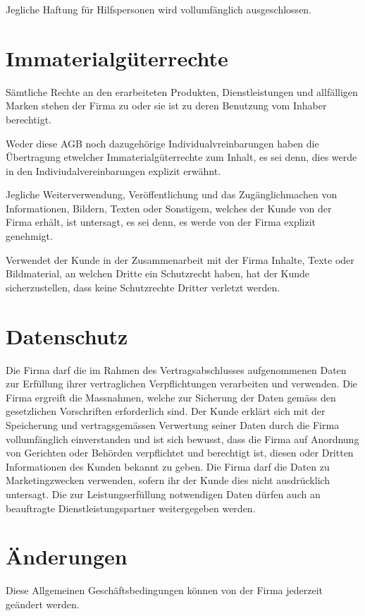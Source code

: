 \documentclass[twocolumn, 10pt]{article}
\begin{document}
Jegliche Haftung für Hilfspersonen wird vollumfänglich ausgeschlossen.

\section{Immaterialgüterrechte}
Sämtliche Rechte an den erarbeiteten Produkten, Dienstleistungen und allfälligen Marken stehen der Firma zu oder sie ist zu deren Benutzung vom Inhaber berechtigt.

Weder diese AGB noch dazugehörige Individualvreinbarungen haben die Übertragung etwelcher Immaterialgüterrechte zum Inhalt, es sei denn, dies werde in den Indiviudalvereinbarungen explizit erwähnt.

Jegliche Weiterverwendung, Veröffentlichung und das Zugänglichmachen von Informationen, Bildern, Texten oder Sonstigem, welches der Kunde von der Firma erhält, ist untersagt, es sei denn, es werde von der Firma explizit genehmigt.

Verwendet der Kunde in der Zusammenarbeit mit der Firma Inhalte, Texte oder Bildmaterial, an welchen Dritte ein Schutzrecht haben, hat der Kunde sicherzustellen, dass keine Schutzrechte Dritter verletzt werden.

\section{Datenschutz}
Die Firma darf die im Rahmen des Vertragsabschlusses aufgenommenen Daten zur Erfüllung ihrer vertraglichen Verpflichtungen verarbeiten und verwenden. Die Firma ergreift die Massnahmen, welche zur Sicherung der Daten gemäss den gesetzlichen Vorschriften erforderlich sind. Der Kunde erklärt sich mit der Speicherung und vertragsgemässen Verwertung seiner Daten durch die Firma vollumfänglich einverstanden und ist sich bewusst, dass die Firma auf Anordnung von Gerichten oder Behörden verpflichtet und berechtigt ist, diesen oder Dritten Informationen des Kunden bekannt zu geben. Die Firma darf die Daten zu Marketingzwecken verwenden, sofern ihr der Kunde dies nicht ausdrücklich untersagt. Die zur Leistungserfüllung notwendigen Daten dürfen auch an beauftragte Dienstleistungspartner weitergegeben werden.

\section{Änderungen}
Diese Allgemeinen Geschäftsbedingungen können von der Firma jederzeit geändert werden.
\end{document}
